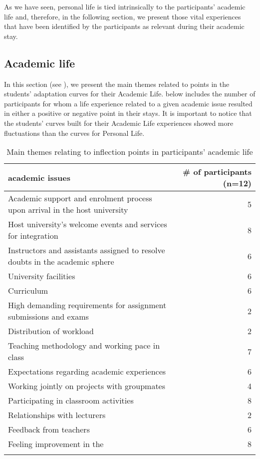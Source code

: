 \documentclass[output=paper]{langsci/langscibook}
\begin{document}
As we have seen, personal life is tied intrinsically to the participants’ academic life and, therefore, in the following section, we present those vital experiences that have been identified by the participants as relevant during their academic stay.  


 
\subsection{Academic life}

In this section (see ), we present the main themes related to  points in the students’ adaptation curves for their Academic Life.  below includes the number of participants for whom a life experience related to a given academic issue resulted in either a positive or negative  point in their stays. It is important to notice that the students’ curves built for their Academic Life experiences showed more fluctuations than the curves for Personal Life.

\begin{table}[t]
\begin{tabularx}{\textwidth}{Qr}
\lsptoprule
 \bfseries academic issues & \bfseries \# of participants (n=12)\\
 \midrule
Academic support and enrolment process upon arrival in the host university & 5\\
\tablevspace 
Host university’s welcome events and services for integration & 8\\
\tablevspace 
Instructors and assistants assigned to resolve doubts in the academic sphere & 6\\
\tablevspace 
University facilities & 6\\
\tablevspace 
Curriculum & 6\\
\tablevspace 
High demanding requirements for assignment submissions and exams & 2\\
\tablevspace 
Distribution of workload & 2\\
\tablevspace 
Teaching methodology and working pace in class & 7\\
\tablevspace 
Expectations regarding academic experiences & 6\\
\tablevspace 
Working jointly on projects with groupmates & 4\\
\tablevspace 
Participating in classroom activities & 8\\
\tablevspace 
Relationships with lecturers & 2\\
\tablevspace 
Feedback from teachers & 6\\
\tablevspace 
Feeling improvement in the  & 8\\
\lspbottomrule
\end{tabularx} 
\caption{Main themes relating to inflection points in participants’ academic life}
\label{tab:pogorelova:3}
\end{table}
\end{document}
